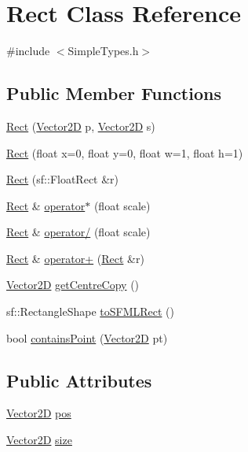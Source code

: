 \hypertarget{class_rect}{}\section{Rect Class Reference}
\label{class_rect}


{\ttfamily \#include $<$Simple\+Types.\+h$>$}

\subsection*{Public Member Functions}
\begin{DoxyCompactItemize}
\item 
\hyperlink{class_rect_aa012b316b26079135d9ba828a1330f25}{Rect} (\hyperlink{class_vector2_d}{Vector2D} p, \hyperlink{class_vector2_d}{Vector2D} s)
\item 
\hyperlink{class_rect_aed61433871ffc936171fb1b3b3e3d594}{Rect} (float x=0, float y=0, float w=1, float h=1)
\item 
\hyperlink{class_rect_a5a9cc5f94ff1406c02032bb3676d63e5}{Rect} (sf\+::\+Float\+Rect \&r)
\item 
\hyperlink{class_rect}{Rect} \& \hyperlink{class_rect_a6e26d2923ad8159589fc12e7e857b21a}{operator$\ast$} (float scale)
\item 
\hyperlink{class_rect}{Rect} \& \hyperlink{class_rect_a60d8364198cd7377ebe07ecff6283e49}{operator/} (float scale)
\item 
\hyperlink{class_rect}{Rect} \& \hyperlink{class_rect_a9ceb8cc44e42709056d20d4bbdca15d7}{operator+} (\hyperlink{class_rect}{Rect} \&r)
\item 
\hyperlink{class_vector2_d}{Vector2D} \hyperlink{class_rect_a50af4844d2bd0beb72b75a9890067e43}{get\+Centre\+Copy} ()
\item 
sf\+::\+Rectangle\+Shape \hyperlink{class_rect_a76b9893692559088ccb285e9c3e012c8}{to\+S\+F\+M\+L\+Rect} ()
\item 
bool \hyperlink{class_rect_a81e3d93bf30b2b695058b774f42b4e76}{contains\+Point} (\hyperlink{class_vector2_d}{Vector2D} pt)
\end{DoxyCompactItemize}
\subsection*{Public Attributes}
\begin{DoxyCompactItemize}
\item 
\hyperlink{class_vector2_d}{Vector2D} \hyperlink{class_rect_adb745feadff27b831623019704522ec6}{pos}
\item 
\hyperlink{class_vector2_d}{Vector2D} \hyperlink{class_rect_a1e41d6169d2df56206b3c671480f6e9c}{size}
\end{DoxyCompactItemize}


